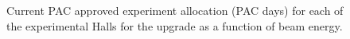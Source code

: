 \begin{figure}[htbp]
\vspace{9.8cm} 
\caption{\small{Current PAC approved experiment allocation (PAC days) for 
each of the experimental Halls for the upgrade as a function of beam energy.}}
\label{beam_time}
\end{figure}
